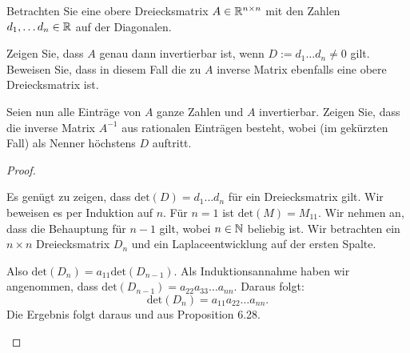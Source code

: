 \begin{Problem}
	Betrachten Sie eine obere Dreiecksmatrix $A\in \mathbb{R}^{n\times n}$ mit den Zahlen $d_1,\dots d_n\in \mathbb{R}$ auf der Diagonalen.
	\begin{parts}
		\item Zeigen Sie, dass $A$ genau dann invertierbar ist, wenn $D:= d_1\dots d_n\neq 0$ gilt. Beweisen Sie, dass in diesem Fall die zu $A$ inverse Matrix ebenfalls eine obere Dreiecksmatrix ist.
		\item  Seien nun alle Einträge von $A$ ganze Zahlen und $A$ invertierbar. Zeigen Sie, dass die inverse Matrix $A^{-1}$ aus rationalen Einträgen besteht, wobei (im gekürzten Fall) als Nenner höchstens $D$ auftritt.
	\end{parts}
\end{Problem}
\begin{proof}
	\begin{parts}
	\item Es genügt zu zeigen, dass $\text{det}(D)=d_1\dots d_n$ f\"{u}r ein Dreiecksmatrix gilt. Wir beweisen es per Induktion auf $n$. F\"{u}r $n=1$ ist $\text{det}(M)=M_{11}$. Wir nehmen an, dass die Behauptung f\"{u}r $n-1$ gilt, wobei $n\in \mathbb{N}$ beliebig ist. Wir betrachten ein $n\times n$ Dreiecksmatrix $D_n$ und ein Laplaceentwicklung auf der ersten Spalte.
		\begin{center}
		\end{center}
		Also $\text{det}(D_n)=a_{11}\text{det}(D_{n-1})$. Als Induktionsannahme haben wir angenommen, dass $\text{det}(D_{n-1})=a_{22}a_{33}\dots a_{nn}$. Daraus folgt:
		\[
			\text{det}(D_n)=a_{11}a_{22}\dots a_{nn}
		.\] 
		Die Ergebnis folgt daraus und aus Proposition 6.28.
	\end{parts}
\end{proof}
